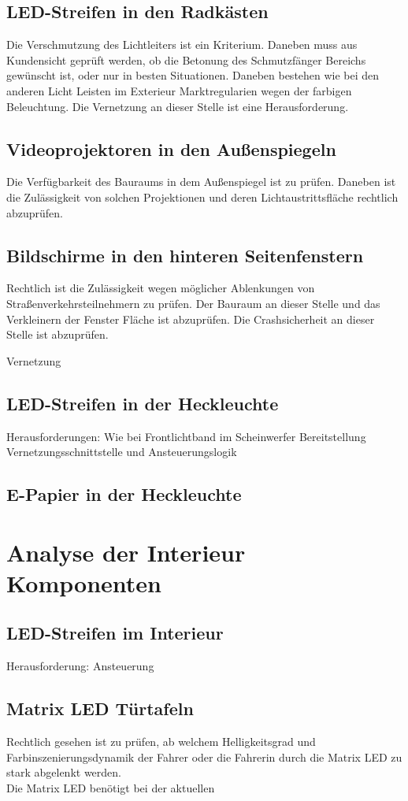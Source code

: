 \subsection{LED-Streifen in den Radkästen}
Die Verschmutzung des Lichtleiters ist ein Kriterium.
Daneben muss aus Kundensicht geprüft werden, ob die Betonung des Schmutzfänger Bereichs gewünscht ist, oder nur in besten Situationen.
Daneben bestehen wie bei den anderen Licht Leisten im Exterieur Marktregularien wegen der farbigen Beleuchtung. Die Vernetzung an dieser Stelle ist eine Herausforderung.
\subsection{Videoprojektoren in den Außenspiegeln}
Die Verfügbarkeit des Bauraums in dem Außenspiegel ist zu prüfen. Daneben ist die Zulässigkeit von solchen Projektionen und deren Lichtaustrittsfläche rechtlich abzuprüfen.
\subsection{Bildschirme in den hinteren Seitenfenstern}
Rechtlich ist die Zulässigkeit wegen möglicher Ablenkungen von Straßenverkehrsteilnehmern zu prüfen.
Der Bauraum an dieser Stelle und das Verkleinern der Fenster Fläche ist abzuprüfen.
Die Crashsicherheit an dieser Stelle ist abzuprüfen.

Vernetzung
\subsection{LED-Streifen in der Heckleuchte}
Herausforderungen:
Wie bei Frontlichtband im Scheinwerfer
Bereitstellung Vernetzungsschnittstelle und Ansteuerungslogik

\subsection{E-Papier in der Heckleuchte}

\section{Analyse der Interieur Komponenten}
\subsection{LED-Streifen im Interieur}
Herausforderung:
Ansteuerung
\subsection{Matrix LED Türtafeln}
Rechtlich gesehen ist zu prüfen, ab welchem Helligkeitsgrad und Farbinszenierungsdynamik der Fahrer oder die Fahrerin durch die Matrix LED zu stark abgelenkt werden.\\
Die Matrix LED benötigt bei der aktuellen 
